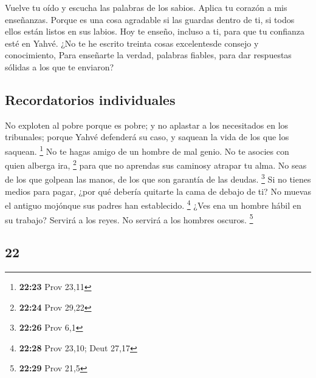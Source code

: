 \begin{paracol}{2}
 Vuelve tu oído y escucha las palabras de los sabios.
Aplica tu corazón a mis enseñanzas.  Porque es una cosa
agradable si las guardas dentro de ti, si todos ellos están listos en
sus labios.  Hoy te enseño, incluso a ti, para que tu
confianza esté en Yahvé.  ¿No te he escrito treinta cosas
excelentesde consejo y conocimiento,  Para enseñarte la
verdad, palabras fiables, para dar respuestas sólidas a los que te
enviaron?

\hypertarget{recordatorios-individuales}{%
\subsection{Recordatorios
individuales}\label{recordatorios-individuales}}

 No exploten al pobre porque es pobre; y no aplastar a
los necesitados en los tribunales;  porque Yahvé
defenderá su caso, y saquean la vida de los que los saquean. \footnote{\textbf{22:23}
  Prov 23,11}  No te hagas amigo de un hombre de mal
genio. No te asocies con quien alberga ira, \footnote{\textbf{22:24}
  Prov 29,22}  para que no aprendas sus caminosy atrapar
tu alma.  No seas de los que golpean las manos, de los
que son garantía de las deudas. \footnote{\textbf{22:26} Prov 6,1}
 Si no tienes medios para pagar, ¿por qué debería
quitarte la cama de debajo de ti?  No muevas el antiguo
mojónque sus padres han establecido. \footnote{\textbf{22:28} Prov
  23,10; Deut 27,17}  ¿Ves ena un hombre hábil en su
trabajo? Servirá a los reyes. No servirá a los hombres oscuros.
\footnote{\textbf{22:29} Prov 21,5}

\switchcolumn
\begin{otherlanguage}{english}

\hypertarget{section-43}{%
\section{22}\label{section-43}}


\end{otherlanguage}
\end{paracol}
